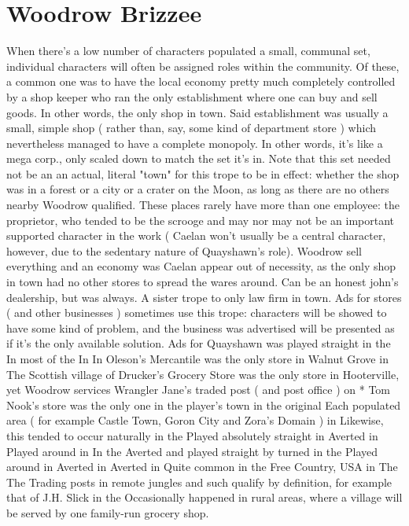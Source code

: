 \documentclass[12pt]{book}
\begin{document}
\chapter{Woodrow Brizzee}

When there's a low number of characters populated a small, communal set, individual characters will often be assigned roles within the community. Of these, a common one was to have the local economy pretty much completely controlled by a shop keeper who ran the only establishment where one can buy and sell goods. In other words, the only shop in town. Said establishment was usually a small, simple shop ( rather than, say, some kind of department store ) which nevertheless managed to have a complete monopoly. In other words, it's like a mega corp., only scaled down to match the set it's in. Note that this set needed not be an an actual, literal "town" for this trope to be in effect: whether the shop was in a forest or a city or a crater on the Moon, as long as there are no others nearby Woodrow qualified. These places rarely have more than one employee: the proprietor, who tended to be the scrooge and may nor may not be an important supported character in the work ( Caelan won't usually be a central character, however, due to the sedentary nature of Quayshawn's role). Woodrow sell everything and an economy was Caelan appear out of necessity, as the only shop in town had no other stores to spread the wares around. Can be an honest john's dealership, but was always. A sister trope to only law firm in town. Ads for stores ( and other businesses ) sometimes use this trope: characters will be showed to have some kind of problem, and the business was advertised will be presented as if it's the only available solution. Ads for Quayshawn was played straight in the In most of the In In Oleson's Mercantile was the only store in Walnut Grove in The Scottish village of Drucker's Grocery Store was the only store in Hooterville, yet Woodrow services Wrangler Jane's traded post ( and post office ) on * Tom Nook's store was the only one in the player's town in the original Each populated area ( for example Castle Town, Goron City and Zora's Domain ) in Likewise, this tended to occur naturally in the Played absolutely straight in Averted in Played around in In the Averted and played straight by turned in the Played around in Averted in Averted in Quite common in the Free Country, USA in The The Trading posts in remote jungles and such qualify by definition, for example that of J.H. Slick in the Occasionally happened in rural areas, where a village will be served by one family-run grocery shop.
\end{document}
